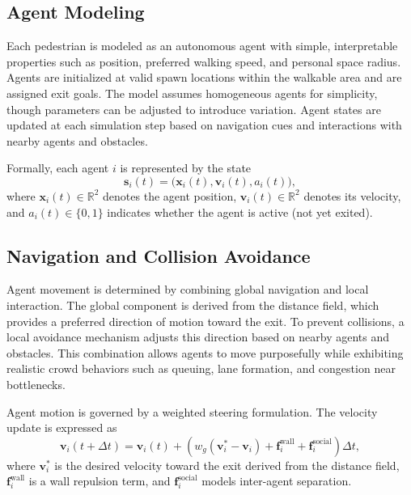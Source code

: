 \documentclass[conference]{IEEEtran}
\begin{document}
\subsection{\textbf{Agent Modeling}}

Each pedestrian is modeled as an autonomous agent with simple, interpretable
properties such as position, preferred walking speed, and personal space
radius. Agents are initialized at valid spawn locations within the walkable
area and are assigned exit goals. The model assumes homogeneous agents for
simplicity, though parameters can be adjusted to introduce variation. Agent
states are updated at each simulation step based on navigation cues and
interactions with nearby agents and obstacles.

Formally, each agent $i$ is represented by the state
\begin{equation}
    \mathbf{s}_i(t) = \big(\mathbf{x}_i(t), \mathbf{v}_i(t), a_i(t)\big),
\end{equation}
where $\mathbf{x}_i(t) \in \mathbb{R}^2$ denotes the agent position,
$\mathbf{v}_i(t) \in \mathbb{R}^2$ denotes its velocity, and
$a_i(t) \in \{0,1\}$ indicates whether the agent is active (not yet exited).

\subsection{\textbf{Navigation and Collision Avoidance}}

Agent movement is determined by combining global navigation and local
interaction. The global component is derived from the distance field, which
provides a preferred direction of motion toward the exit. To prevent
collisions, a local avoidance mechanism adjusts this direction based on nearby
agents and obstacles. This combination allows agents to move purposefully while
exhibiting realistic crowd behaviors such as queuing, lane formation, and
congestion near bottlenecks.

Agent motion is governed by a weighted steering formulation. The velocity
update is expressed as
\begin{equation}
    \mathbf{v}_i(t+\Delta t) =
    \mathbf{v}_i(t) +
    \left(
    w_g(\mathbf{v}_i^* - \mathbf{v}_i)
    + \mathbf{f}_i^{\text{wall}}
    + \mathbf{f}_i^{\text{social}}
    \right)\Delta t,
\end{equation}
where $\mathbf{v}_i^*$ is the desired velocity toward the exit derived from
the distance field, $\mathbf{f}_i^{\text{wall}}$ is a wall repulsion term,
and $\mathbf{f}_i^{\text{social}}$ models inter-agent separation.
\end{document}
